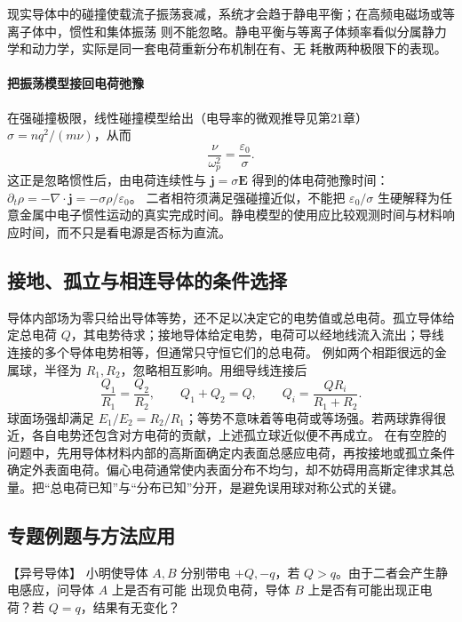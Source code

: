 {现实导体中的碰撞使载流子振荡衰减，系统才会趋于静电平衡；在高频电磁场或等离子体中，惯性和集体振荡
则不能忽略。静电平衡与等离子体频率看似分属静力学和动力学，实际是同一套电荷重新分布机制在有、无
耗散两种极限下的表现。

\paragraph{把振荡模型接回电荷弛豫}
在强碰撞极限，线性碰撞模型给出（电导率的微观推导见第21章） $\sigma=nq^2/(m\nu)$，从而
\[
 \frac{\nu}{\omega_p^2}=\frac{\varepsilon_0}{\sigma}.
\]
这正是忽略惯性后，由电荷连续性与 $\boldsymbol j=\sigma\boldsymbol E$ 得到的体电荷弛豫时间：
$\partial_t\rho=-\nabla\cdot\boldsymbol j=-\sigma\rho/\varepsilon_0$。
二者相符须满足强碰撞近似，不能把 $\varepsilon_0/\sigma$ 生硬解释为任意金属中电子惯性运动的真实完成时间。静电模型的使用应比较观测时间与材料响应时间，而不只是看电源是否标为直流。




\subsection{接地、孤立与相连导体的条件选择}
导体内部场为零只给出导体等势，还不足以决定它的电势值或总电荷。孤立导体给定总电荷 $Q$，其电势待求；接地导体给定电势，电荷可以经地线流入流出；导线连接的多个导体电势相等，但通常只守恒它们的总电荷。
例如两个相距很远的金属球，半径为 $R_1,R_2$，忽略相互影响。用细导线连接后
\[
 \frac{Q_1}{R_1}=\frac{Q_2}{R_2},\qquad Q_1+Q_2=Q,
 \qquad Q_i=\frac{QR_i}{R_1+R_2}.
\]
球面场强却满足 $E_1/E_2=R_2/R_1$；等势不意味着等电荷或等场强。若两球靠得很近，各自电势还包含对方电荷的贡献，上述孤立球近似便不再成立。
在有空腔的问题中，先用导体材料内部的高斯面确定内表面总感应电荷，再按接地或孤立条件确定外表面电荷。偏心电荷通常使内表面分布不均匀，却不妨碍用高斯定律求其总量。把“总电荷已知”与“分布已知”分开，是避免误用球对称公式的关键。


\subsection{专题例题与方法应用}

\begin{origexamplebox}{【异号导体】}\label{ch20:ex:s34-3-1}
小明使导体 $A,B$ 分别带电 $+Q,-q$，若 $Q>q$。由于二者会产生静电感应，问导体 $A$ 上是否有可能
出现负电荷，导体 $B$ 上是否有可能出现正电荷？若 $Q=q$，结果有无变化？

\ThQOppositeConductors
\end{origexamplebox}\par\nopagebreak[4]

}
